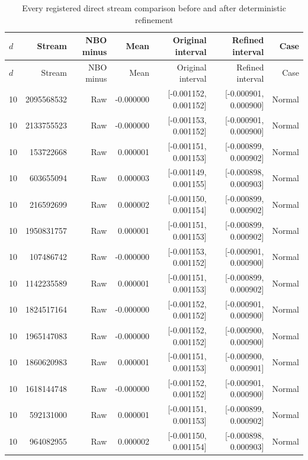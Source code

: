\begingroup\small
\begin{longtable}{lrrrrrr}
\caption{Every registered direct stream comparison before and after deterministic refinement}\label{tab:r15-paired-refined-seeds}\\
\toprule
$d$ & Stream & NBO minus & Mean & Original interval & Refined interval & Case \\
\midrule
\endfirsthead
\toprule
$d$ & Stream & NBO minus & Mean & Original interval & Refined interval & Case \\
\midrule
\endhead
10 & 2095568532 & Raw & -0.000000 & [-0.001152, 0.001152] & [-0.000901, 0.000900] & Normal \\
10 & 2133755523 & Raw & -0.000000 & [-0.001153, 0.001152] & [-0.000901, 0.000900] & Normal \\
10 & 153722668 & Raw & 0.000001 & [-0.001151, 0.001153] & [-0.000899, 0.000902] & Normal \\
10 & 603655094 & Raw & 0.000003 & [-0.001149, 0.001155] & [-0.000898, 0.000903] & Normal \\
10 & 216592699 & Raw & 0.000002 & [-0.001150, 0.001154] & [-0.000899, 0.000902] & Normal \\
10 & 1950831757 & Raw & 0.000001 & [-0.001151, 0.001153] & [-0.000899, 0.000902] & Normal \\
10 & 107486742 & Raw & -0.000000 & [-0.001153, 0.001152] & [-0.000901, 0.000900] & Normal \\
10 & 1142235589 & Raw & 0.000001 & [-0.001151, 0.001153] & [-0.000899, 0.000902] & Normal \\
10 & 1824517164 & Raw & -0.000000 & [-0.001152, 0.001152] & [-0.000901, 0.000900] & Normal \\
10 & 1965147083 & Raw & -0.000000 & [-0.001152, 0.001152] & [-0.000900, 0.000900] & Normal \\
10 & 1860620983 & Raw & 0.000001 & [-0.001151, 0.001153] & [-0.000900, 0.000901] & Normal \\
10 & 1618144748 & Raw & -0.000000 & [-0.001152, 0.001152] & [-0.000901, 0.000900] & Normal \\
10 & 592131000 & Raw & 0.000001 & [-0.001151, 0.001153] & [-0.000899, 0.000902] & Normal \\
10 & 964082955 & Raw & 0.000002 & [-0.001150, 0.001154] & [-0.000898, 0.000903] & Normal \\

\end{longtable}
